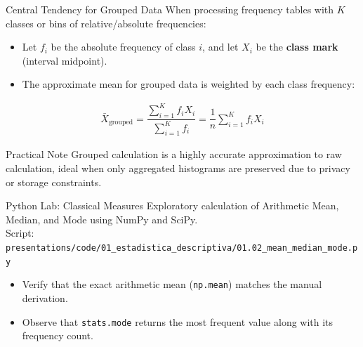 \documentclass[aspectratio=169,xcolor={dvipsnames,table}]{beamer}
\begin{document}
\begin{frame}{Central Tendency for Grouped Data}
  When processing frequency tables with $K$ classes or bins of relative/absolute frequencies: \pause
  \begin{itemize}
    \item Let $f_i$ be the absolute frequency of class $i$, and let $X_i$ be the \textbf{class mark} (interval midpoint). \pause
    \item The approximate mean for grouped data is weighted by each class frequency:
  \end{itemize}
  \begin{align}
    \bar{X}_{\text{grouped}} = \dfrac{\sum_{i=1}^{K} f_i X_i}{\sum_{i=1}^{K} f_i} = \dfrac{1}{n} \sum_{i=1}^{K} f_i X_i
  \end{align}
  \pause
  \begin{alertblock}{Practical Note}
    Grouped calculation is a highly accurate approximation to raw calculation, ideal when only aggregated histograms are preserved due to privacy or storage constraints.
  \end{alertblock}
\end{frame}

\begin{frame}[fragile]{Python Lab: Classical Measures}
  \scriptsize
  Exploratory calculation of Arithmetic Mean, Median, and Mode using NumPy and SciPy.
  \\ Script: \texttt{\footnotesize presentations/code/01\_estadistica\_descriptiva/01.02\_mean\_median\_mode.py}
  
  \vspace{-0.1em}
  {\lstset{basicstyle=\ttfamily\tiny, aboveskip=0.2em, belowskip=0.2em}
  
  }

  \vspace{-0.1em}
  \begin{itemize}
    \item Verify that the exact arithmetic mean (\texttt{np.mean}) matches the manual derivation.
    \item Observe that \texttt{stats.mode} returns the most frequent value along with its frequency count.
  \end{itemize}
\end{frame}
\end{document}
